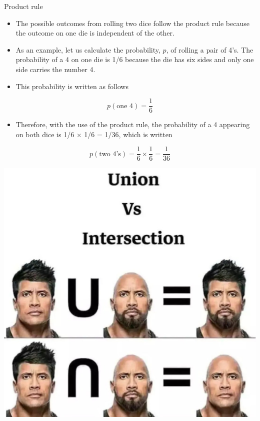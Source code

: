 \documentclass[11pt,ignorenonframetext,aspectratio=169]{beamer}
\providecommand{\tightlist}{%
  \setlength{\itemsep}{0pt}\setlength{\parskip}{0pt}}
\begin{document}
\begin{frame}{Product rule}
\protect\hypertarget{product-rule}{}
\begin{itemize}
\tightlist
\item
  The possible outcomes from rolling two dice follow the product rule
  because the outcome on one die is independent of the other.
\item
  As an example, let us calculate the probability, \(p\), of rolling a
  pair of 4's. The probability of a 4 on one die is 1/6 because the die
  has six sides and only one side carries the number 4.
\item
  This probability is written as follows
\end{itemize}

\[
p (\textrm{one 4}) = \frac{1}{6}
\]

\begin{itemize}
\tightlist
\item
  Therefore, with the use of the product rule, the probability of a 4
  appearing on both dice is 1/6 × 1/6 = 1/36, which is written
\end{itemize}

\[
p (\textrm{two 4's}) = \frac{1}{6} \times \frac{1}{6} = \frac{1}{36}
\]
\end{frame}

\begin{frame}{}
\protect\hypertarget{section}{}
\begin{center}\includegraphics[width=0.45\linewidth]{../images/sum_versus_product} \end{center}
\end{frame}
\end{document}
